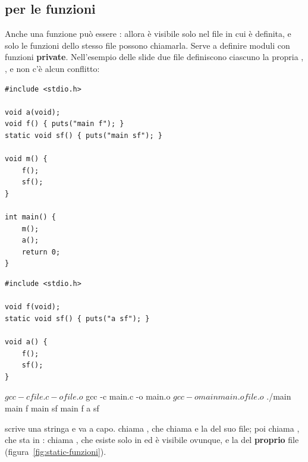 
\subsection{ per le funzioni}

Anche una funzione può essere : allora è visibile solo nel file
in cui è definita, e solo le funzioni dello stesso file possono chiamarla.
Serve a definire moduli con funzioni \textbf{private}. Nell'esempio delle
slide due file definiscono ciascuno la propria , , e
non c'è alcun conflitto:

\begin{affianco}[0.5][t]
\begin{lstlisting}[style=c, name=main.c]
#include <stdio.h>

void a(void);
void f() { puts("main f"); }
static void sf() { puts("main sf"); }

void m() {
    f();
    sf();
}

int main() {
    m();
    a();
    return 0;
}
\end{lstlisting}
\risultato
\begin{lstlisting}[style=c, name=file.c]
#include <stdio.h>

void f(void);
static void sf() { puts("a sf"); }

void a() {
    f();
    sf();
}
\end{lstlisting}
\begin{console}
$ gcc -c file.c -o file.o
$ gcc -c main.c -o main.o
$ gcc -o main main.o file.o
$ ./main
main f
main sf
main f
a sf
\end{console}
\end{affianco}

 scrive una stringa e va a capo.  chiama , che
chiama  e la  del suo file; poi chiama , che sta in
:  chiama , che esiste solo in  ed
è visibile ovunque, e la  del \textbf{proprio} file
(figura~\ref{fig:static-funzioni}).

